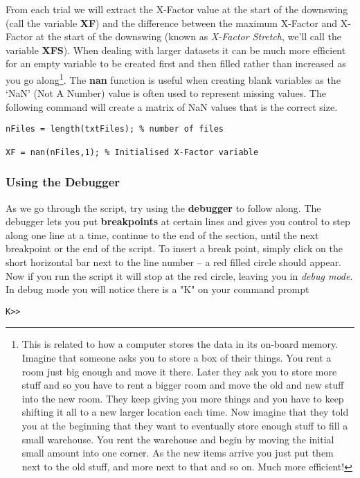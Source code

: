 \documentclass[12pt,a4paper]{article}
\begin{document}
From each trial we will extract the X-Factor value at the start of the downswing (call the variable \textbf{XF}) and the difference between the maximum X-Factor and X-Factor at the start of the downswing (known as \emph{X-Factor Stretch}, we'll call the variable \textbf{XFS}).
When dealing with larger datasets it can be much more efficient for an empty variable to be created first and then filled rather than increased as you go along\footnote{This is related to how a computer stores the data in its on-board memory.  Imagine that someone asks you to store a box of their things.  You rent a room just big enough and move it there.  Later they ask you to store more stuff and so you have to rent a bigger room and move the old and new stuff into the new room.  They keep giving you more things and you have to keep shifting it all to a new larger location each time.  Now imagine that they told you at the beginning that they want to eventually store enough stuff to fill a small warehouse.  You rent the warehouse and begin by moving the initial small amount into one corner.  As the new items arrive you just put them next to the old stuff, and more next to that and so on.  Much more efficient!}.
The \textbf{nan} function is useful when creating blank variables as the `NaN' (Not A Number) value is often used to represent missing values.  The following command will create a matrix of NaN values that is the correct size.
\begin{lstlisting}[style=Matlab-editor]
nFiles = length(txtFiles); % number of files

XF = nan(nFiles,1); % Initialised X-Factor variable
\end{lstlisting}

\subsubsection{Using the Debugger}
As we go through the script, try using the \textbf{debugger} to follow along.
The debugger lets you put \textbf{breakpoints} at certain lines and gives you control to step along one line at a time, continue to the end of the section, until the next breakpoint or the end of the script.
To insert a break point, simply click on the short horizontal bar next to the line number – a red filled circle should appear.
Now if you run the script it will stop at the red circle, leaving you in \emph{debug mode}.
In debug mode you will notice there is a "K" on your command prompt

\begin{lstlisting}[style=Matlab-editor]
K>> 
\end{lstlisting}
\end{document}
